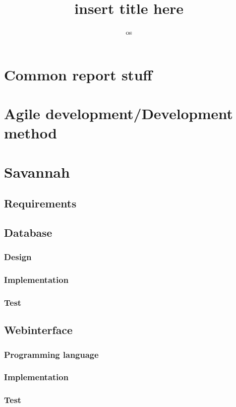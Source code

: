 

\title{insert title here} %
\author{os} %


\maketitle
\tableofcontents

\chapter{Common report stuff} %
\chapter{Agile development/Development method} %
\chapter{Savannah} %
  \section{Requirements}
  \section{Database}
    \subsection{Design}
    \subsection{Implementation}
    \subsection{Test}

  \section{Webinterface}
     \subsection{Programming language}
      
     \subsection{Implementation}
     \subsection{Test}

